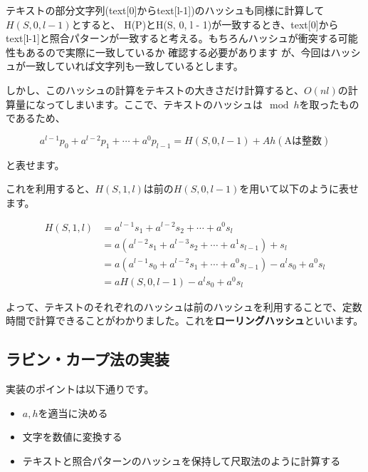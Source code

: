 \documentclass{jlreq}
\begin{document}
テキストの部分文字列(text[0]からtext[l-1])のハッシュも同様に計算して$H(S, 0, l -1)$とすると、
H(P)とH(S, 0, l - 1)が一致するとき、text[0]からtext[l-1]と照合パターンが一致すると考える。もちろんハッシュが衝突する可能性もあるので実際に一致しているか
確認する必要があります
が、今回はハッシュが一致していれば文字列も一致しているとします。

しかし、このハッシュの計算をテキストの大きさだけ計算すると、$O(nl)$の計算量になってしまいます。ここで、テキストのハッシュは$\mod h$を取ったものであるため、

\begin{equation}
    a^{l-1} p_0 + a^{l-2} p_1 + \cdots + a^0 p_{l-1} = H(S, 0, l - 1) + Ah (\text{Aは整数})
\end{equation}

と表せます。

これを利用すると、$H(S, 1, l)$は前の$H(S, 0, l - 1)$を用いて以下のように表せます。

\begin{align}
    H(S, 1, l) &= a^{l-1}s_1 + a^{l-2}s_2 + \cdots + a^0s_l \nonumber\\ 
    &= a(a^{l-2}s_1 + a^{l-3}s_2 + \cdots + a^1s_{l-1}) + s_l \nonumber\\
    &= a(a^{l-1} s_0 + a^{l-2}s_1 + \cdots + a^0 s_{l-1}) - a^{l} s_0 + a^0 s_l \nonumber \\
    &= aH(S, 0, l - 1) - a^{l} s_0 + a^0 s_l 
\end{align}

よって、テキストのそれぞれのハッシュは前のハッシュを利用することで、定数時間で計算できることがわかりました。これを\textbf{ローリングハッシュ}といいます。

\subsection{ラビン・カープ法の実装}

実装のポイントは以下通りです。

\begin{itemize}
    \item $a, h$を適当に決める
    \item 文字を数値に変換する
    \item テキストと照合パターンのハッシュを保持して尺取法のように計算する
\end{itemize}

\newpage
\end{document}
